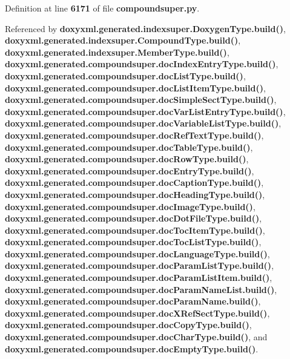 Definition at line {\bf 6171} of file {\bf compoundsuper.\+py}.



Referenced by {\bf doxyxml.\+generated.\+indexsuper.\+Doxygen\+Type.\+build()}, {\bf doxyxml.\+generated.\+indexsuper.\+Compound\+Type.\+build()}, {\bf doxyxml.\+generated.\+indexsuper.\+Member\+Type.\+build()}, {\bf doxyxml.\+generated.\+compoundsuper.\+doc\+Index\+Entry\+Type.\+build()}, {\bf doxyxml.\+generated.\+compoundsuper.\+doc\+List\+Type.\+build()}, {\bf doxyxml.\+generated.\+compoundsuper.\+doc\+List\+Item\+Type.\+build()}, {\bf doxyxml.\+generated.\+compoundsuper.\+doc\+Simple\+Sect\+Type.\+build()}, {\bf doxyxml.\+generated.\+compoundsuper.\+doc\+Var\+List\+Entry\+Type.\+build()}, {\bf doxyxml.\+generated.\+compoundsuper.\+doc\+Variable\+List\+Type.\+build()}, {\bf doxyxml.\+generated.\+compoundsuper.\+doc\+Ref\+Text\+Type.\+build()}, {\bf doxyxml.\+generated.\+compoundsuper.\+doc\+Table\+Type.\+build()}, {\bf doxyxml.\+generated.\+compoundsuper.\+doc\+Row\+Type.\+build()}, {\bf doxyxml.\+generated.\+compoundsuper.\+doc\+Entry\+Type.\+build()}, {\bf doxyxml.\+generated.\+compoundsuper.\+doc\+Caption\+Type.\+build()}, {\bf doxyxml.\+generated.\+compoundsuper.\+doc\+Heading\+Type.\+build()}, {\bf doxyxml.\+generated.\+compoundsuper.\+doc\+Image\+Type.\+build()}, {\bf doxyxml.\+generated.\+compoundsuper.\+doc\+Dot\+File\+Type.\+build()}, {\bf doxyxml.\+generated.\+compoundsuper.\+doc\+Toc\+Item\+Type.\+build()}, {\bf doxyxml.\+generated.\+compoundsuper.\+doc\+Toc\+List\+Type.\+build()}, {\bf doxyxml.\+generated.\+compoundsuper.\+doc\+Language\+Type.\+build()}, {\bf doxyxml.\+generated.\+compoundsuper.\+doc\+Param\+List\+Type.\+build()}, {\bf doxyxml.\+generated.\+compoundsuper.\+doc\+Param\+List\+Item.\+build()}, {\bf doxyxml.\+generated.\+compoundsuper.\+doc\+Param\+Name\+List.\+build()}, {\bf doxyxml.\+generated.\+compoundsuper.\+doc\+Param\+Name.\+build()}, {\bf doxyxml.\+generated.\+compoundsuper.\+doc\+X\+Ref\+Sect\+Type.\+build()}, {\bf doxyxml.\+generated.\+compoundsuper.\+doc\+Copy\+Type.\+build()}, {\bf doxyxml.\+generated.\+compoundsuper.\+doc\+Char\+Type.\+build()}, and {\bf doxyxml.\+generated.\+compoundsuper.\+doc\+Empty\+Type.\+build()}.



